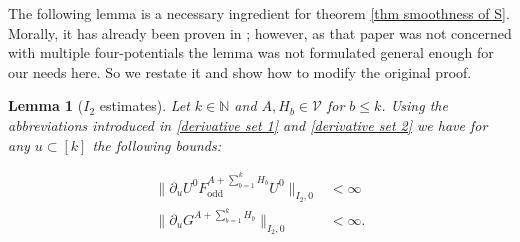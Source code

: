 \documentclass[b5paper,draft,openbib,12pt]{memoir}
\newtheorem{Lemma}[Def]{Lemma}
\DeclareMathOperator{\odd}{odd}
\begin{document}
The following lemma is a necessary ingredient for
theorem \ref{thm smoothness of S}. Morally, it 
has already been proven in 
\cite[Lemma 3.7]{ivp0}; however, as that paper
was not concerned with multiple four-potentials 
the lemma was not formulated general enough 
for our needs here. So we restate it and 
show how to modify the original proof.

\begin{Lemma}[\(I_2\) estimates]\label{F, G off diagonal hilbert schmidt}
Let \(k\in\mathbb{N}\) and 
\(A,H_b\in\mathcal{V}\) for \(b\le k\). 
Using the abbreviations introduced in \eqref{derivative set 1}
and \eqref{derivative set 2}
we have for any \(u\subset [k]\) 
the following bounds:

\begin{align}\label{I2 estimate 1}
\|\partial_u U^0 F_{\odd}^{A+\sum_{b=1}^k H_b} U^0\|_{I_2,0}&<\infty \\\label{I2 estimate 2}
\|\partial_u G^{A+\sum_{b=1}^k H_b}\|_{I_2,0}&<\infty.
\end{align}
\end{Lemma}
\end{document}
